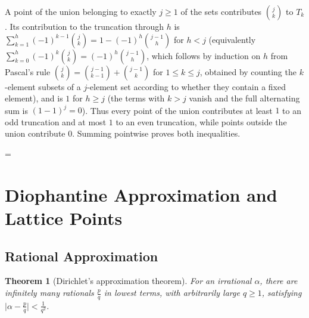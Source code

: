\documentclass[11pt]{article}
\makeatletter
\theoremstyle{ntstyle}
\newtheorem{theorem}{Theorem}[subsection]
\let\nt@closedisplay\]
\def\nt@guardedclose{\@ifnextchar\par{\nt@closeafterpar}{\@ifnextchar\end{\postdisplaypenalty\@M\nt@closedisplay}{\nt@closedisplay}}}
\def\nt@closeafterpar\par{\@ifnextchar\par{\nt@closeafterpar}{\@ifnextchar\end{\postdisplaypenalty\@M\nt@closedisplay\par}{\nt@closedisplay\par}}}
\renewenvironment{proof}[1][\proofname]{\par
  \pushQED{\qed}\normalfont\topsep\medskipamount\edef\nt@afterproof{\@endparpenalty=\the\@endparpenalty\relax}\@beginparpenalty\@M\@endparpenalty\@M\let\]\nt@guardedclose\trivlist\item[]\textit{#1\@addpunct{.}} \ignorespaces}{\ifvmode\addpenalty\@M\fi\popQED\nt@afterproof\endtrivlist\@endpefalse}
\makeatother
\begin{document}
\begin{proof} A point of the union belonging to exactly $j\ge1$ of the
	sets contributes $\binom{j}{k}$ to $T_k$. Its contribution to the
	truncation through $h$ is $\sum_{k=1}^{h}(-1)^{k-1}\binom{j}{k}=1-(-1)^h\binom{j-1}{h}$ for $h<j$ (equivalently
	$\sum_{k=0}^{h}(-1)^{k}\binom{j}{k}=(-1)^{h}\binom{j-1}{h}$, which
		follows by induction on $h$ from Pascal's rule
	$\binom{j}{k}=\binom{j-1}{k-1}+\binom{j-1}{k}$ for $1\le k\le j$, obtained by counting the $k$-element subsets of a $j$-element set according to whether they contain a fixed element), and is $1$ for $h\ge j$ (the terms with $k>j$ vanish and the full alternating sum is $(1-1)^{j}=0$). Thus
		every point of the union contributes at least $1$ to an odd truncation and at
		most $1$ to an even truncation, while points outside the union
		contribute $0$. Summing pointwise proves both inequalities.

\end{proof}
\newpage

\section{Diophantine Approximation and Lattice Points}

\subsection{Rational Approximation}

\begin{theorem}[Dirichlet's approximation theorem]\label{thm:10.1.1} For an irrational $\alpha$,
	there are infinitely many rationals $\tfrac{p}{q}$ in lowest terms, with
	arbitrarily large $q\ge1$, satisfying $\big|\alpha - \tfrac{p}{q}\big| <
		\tfrac{1}{q^2}$.

\end{theorem}
\end{document}
